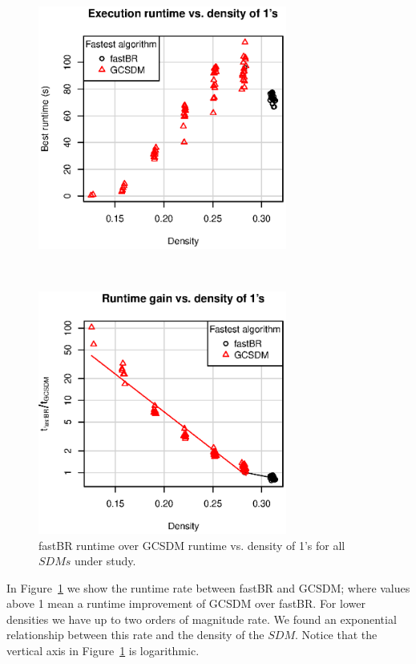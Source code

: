 \documentclass[authoryear,11pt]{elsarticle}
\begin{document}
	\begin{figure}[htb]
	\begin{minipage}{.48\textwidth}
	    \begin{center}
	       \includegraphics[height=8cm]{runtimeVSdensity_low.eps}
	    \end{center}
	\caption{Fastest algorithm runtime vs. density of 1's for all $SDMs$ under study.}
	\label{fig:runtime_low}
	\end{minipage}%
	~
	\begin{minipage}{.48\textwidth}
	    \begin{center}
	       \includegraphics[height=8cm]{rate_runtime.eps}
	    \end{center}
	\caption{fastBR runtime over GCSDM runtime  vs. density of 1's for all $SDMs$ under study.}
	\label{fig:BRvsGAP}
	\end{minipage}	
	\end{figure}	
	
	In Figure~\ref{fig:BRvsGAP} we show the runtime rate between fastBR and GCSDM; where values above
	1 mean a runtime improvement of GCSDM over fastBR. For lower densities we have up to two orders of 
	magnitude rate.
	We found an exponential relationship between this rate and the density of the $SDM$. Notice that the 
	vertical axis in Figure~\ref{fig:BRvsGAP} is logarithmic.
	
\end{document}

